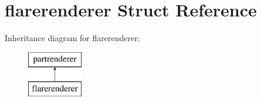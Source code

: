 \hypertarget{structflarerenderer}{}\section{flarerenderer Struct Reference}
\label{structflarerenderer}
Inheritance diagram for flarerenderer\+:\begin{figure}[H]
\begin{center}
\leavevmode
\includegraphics[height=2.000000cm]{structflarerenderer}
\end{center}
\end{figure}
